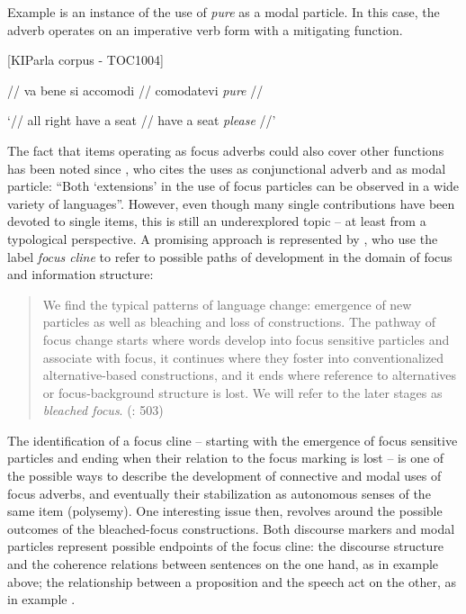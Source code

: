Example  is an instance of the use of \textit{pure} as a modal particle. In this case, the adverb operates on an imperative verb form with a mitigating function.

\ea%
    \label{ex:key:20}

          [KIParla corpus - TOC1004]

// va bene si accomodi // comodatevi \textit{pure} //

\glt ‘// all right have a seat // have a seat \textit{please} //’
    \z

The fact that items operating as focus adverbs could also cover other functions has been noted since \citet[16]{König1991}, who cites the uses as conjunctional adverb and as modal particle: “Both ‘extensions’ in the use of focus particles can be observed in a wide variety of languages”. However, even though many single contributions have been devoted to single items, this is still an underexplored topic – at least from a typological perspective. A promising approach is represented by \citet{EckardtSpeyer2016}, who use the label \textit{focus cline} to refer to possible paths of development in the domain of focus and information structure:

\begin{quote}
We find the typical patterns of language change: emergence of new particles as well as bleaching and loss of constructions. The pathway of focus change starts where words develop into focus sensitive particles and associate with focus, it continues where they foster into conventionalized alternative-based constructions, and it ends where reference to alternatives or focus-background structure is lost. We will refer to the later stages as \textit{bleached focus}. (\citealt{EckardtSpeyer2016}: 503)
\end{quote}

The identification of a focus cline – starting with the emergence of focus sensitive particles and ending when their relation to the focus marking is lost – is one of the possible ways to describe the development of connective and modal uses of focus adverbs, and eventually their stabilization as autonomous senses of the same item (polysemy). One interesting issue then, revolves around the possible outcomes of the bleached-focus constructions. Both discourse markers and modal particles represent possible endpoints of the focus cline: the discourse structure and the coherence relations between sentences on the one hand, as in example  above; the relationship between a proposition and the speech act on the other, as in example .

